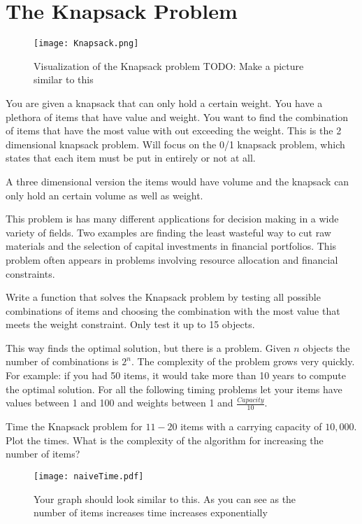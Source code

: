 \label{lab:Knapsack}


\section*{The Knapsack Problem}

\begin{figure}
\texttt{[image: Knapsack.png]}
\caption{Visualization of the Knapsack problem TODO: Make a picture similar to this}
\end{figure}

You are given a knapsack that can only hold a certain weight.
You have a plethora of items that have value and weight.
You want to find the combination of items that have the most value with out exceeding the weight.
This is the 2 dimensional knapsack problem.
Will focus on the 0/1 knapsack problem, which states that each item must be put in entirely or not at all.

A three dimensional version the items would have volume and the knapsack can only hold an certain volume as well as weight. 

This problem is has many different applications for decision making in a wide variety of fields.
Two examples are finding the least wasteful way to cut raw materials and the selection of capital investments in financial portfolios.
This problem often appears in problems involving resource allocation and financial constraints.

\begin{problem}
Write a function that solves the Knapsack problem by testing all possible combinations of items and choosing the combination with the most value that meets the weight constraint.
Only test it up to 15 objects.
\end{problem}

This way finds the optimal solution, but there is a problem.
Given $n$ objects the number of combinations is $2^n$.
The complexity of the problem grows very quickly.
For example: if you had 50 items, it would take more than 10 years to compute the optimal solution.
For all the following timing problems let your items have values between 1 and 100 and weights between 1 and $\frac{Capacity}{10}$.

\begin{problem}
Time the Knapsack problem for $11-20$ items with a carrying capacity of $10,000$.
Plot the times.
What is the complexity of the algorithm for increasing the number of items?

\begin{figure}[H]
\texttt{[image: naiveTime.pdf]}
\caption{
Your graph should look similar to this.
As you can see as the number of items increases time increases exponentially}
\end{figure}
\end{problem}

